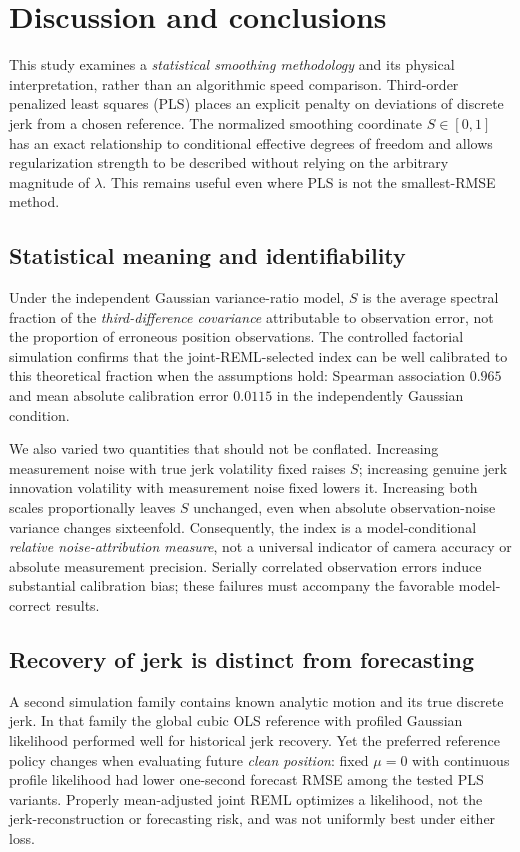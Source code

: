 \section{Discussion and conclusions}
\label{sec:discussion}
This study examines a \emph{statistical smoothing
methodology} and its physical interpretation,
rather than an algorithmic speed comparison.
Third-order penalized least squares (PLS)
places an explicit penalty on deviations
of discrete jerk from a chosen reference.
The normalized smoothing coordinate
$S\in[0,1]$ has an exact relationship
to conditional effective degrees of
freedom and allows regularization
strength to be described without relying
on the arbitrary magnitude of $\lambda$.
This remains useful even where PLS is
not the smallest-RMSE method.

\subsection{Statistical meaning and identifiability}
Under the independent Gaussian
variance-ratio model,
$S$ is the average spectral fraction
of the \emph{third-difference covariance}
attributable to observation error,
not the proportion of erroneous position
observations. The controlled factorial
simulation confirms that the
joint-REML-selected index can be
well calibrated to this theoretical
fraction when the assumptions hold:
Spearman association $0.965$ and mean
absolute calibration error $0.0115$
in the independently Gaussian condition.

We also varied two quantities that
should not be conflated. Increasing
measurement noise with true jerk
volatility fixed raises $S$;
increasing genuine jerk innovation
volatility with measurement noise
fixed lowers it. Increasing both
scales proportionally leaves $S$
unchanged, even when absolute
observation-noise variance changes
sixteenfold. Consequently, the index
is a model-conditional \emph{relative
noise-attribution measure}, not a
universal indicator of camera
accuracy or absolute measurement
precision. Serially correlated
observation errors induce substantial
calibration bias; these failures
must accompany the favorable
model-correct results.

\subsection{Recovery of jerk is distinct from forecasting}
A second simulation family contains
known analytic motion and its true
discrete jerk. In that family the
global cubic OLS reference with
profiled Gaussian likelihood
performed well for historical jerk
recovery. Yet the preferred
reference policy changes when
evaluating future \emph{clean
position}: fixed $\mu=0$ with
continuous profile likelihood
had lower one-second forecast
RMSE among the tested PLS variants.
Properly mean-adjusted joint REML
optimizes a likelihood, not
the jerk-reconstruction or
forecasting risk, and was not
uniformly best under either loss.

